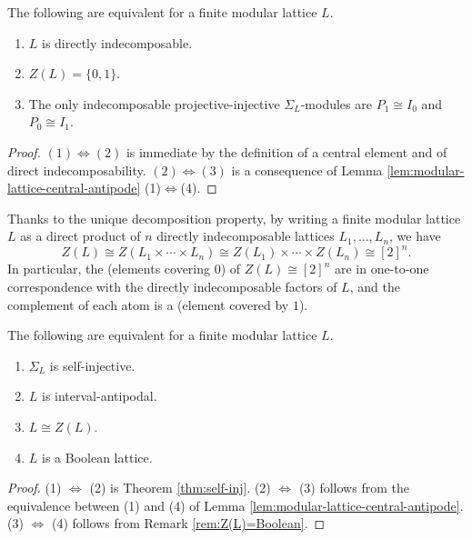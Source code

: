 \documentclass[a4paper,leqno]{amsart}
\begin{document}
\begin{cor}\label{cor:directly indecomposable lattice}
The following are equivalent for a finite modular lattice $L$.
\begin{enumerate}
    \item $L$ is directly indecomposable.
    \item $Z(L)=\{0,1\}$.
    \item The only indecomposable projective-injective $\Sigma_L$-modules are $P_1\cong I_0$ and $P_0\cong I_1$.
\end{enumerate}
\end{cor}
\begin{proof}
$(1)\Leftrightarrow(2)$ is immediate by the definition of a central element and of direct indecomposability.  $(2)\Leftrightarrow(3)$ is a consequence of Lemma \ref{lem:modular-lattice-central-antipode} (1)$\Leftrightarrow$(4).
\end{proof}
\begin{rmk}\label{rem:Z(L)=Boolean}
Thanks to the unique decomposition property, by writing a finite modular lattice $L$ as a direct product of $n$ directly indecomposable lattices $L_1,\ldots, L_n$, we have $$Z(L) \cong Z(L_1\times \cdots  \times  L_n) \cong Z(L_1)\times \cdots \times Z(L_n) \cong [2]^n.$$  
In particular, the  (elements covering $0$) of $Z(L)\cong [2]^n$ are in one-to-one correspondence with the directly indecomposable factors of $L$, and the complement of each atom is a  (element covered by $1$).    
\end{rmk}


\begin{cor}\label{cor:modular-lattice-interval-antipodal}
The following are equivalent for a finite modular lattice $L$.
\begin{enumerate}
    \item $\Sigma_L$ is self-injective.
    \item $L$ is interval-antipodal.
    \item $L\cong Z(L)$.
    \item $L$ is a Boolean lattice.
\end{enumerate}
\end{cor}

\begin{proof}
(1) $\Leftrightarrow$ (2) is Theorem \ref{thm:self-inj}. 
(2) $\Leftrightarrow$ (3) follows from the equivalence between (1) and (4) of Lemma \ref{lem:modular-lattice-central-antipode}.  (3) $\Leftrightarrow$ (4) follows from Remark \ref{rem:Z(L)=Boolean}.
\end{proof}
\end{document}
